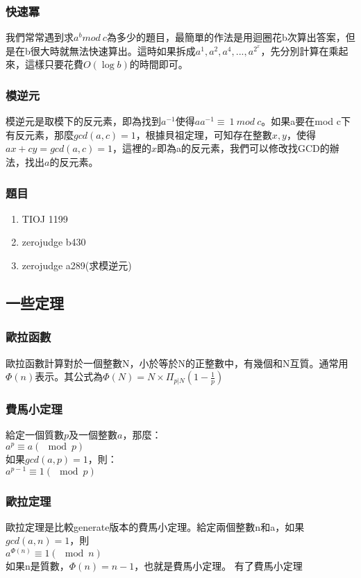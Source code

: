 \subsubsection{快速冪}
我們常常遇到求$a^b mod\ c$為多少的題目，最簡單的作法是用迴圈花b次算出答案，但是在b很大時就無法快速算出。這時如果拆成$a^1,a^2,a^4,...,a^{2^x}$，先分別計算在乘起來，這樣只要花費$O(\log b)$的時間即可。

\subsubsection{模逆元}
模逆元是取模下的反元素，即為找到$a^{-1}$使得$aa^{-1}\equiv\ 1\ mod\ c$。如果a要在mod c下有反元素，那麼$gcd(a,c)=1$，根據貝祖定理，可知存在整數$x,y$，使得$ax+cy=gcd(a,c)=1$，這裡的$x$即為a的反元素，我們可以修改找GCD的辦法，找出$a$的反元素。

\subsubsection{題目}
\begin{enumerate}
\item TIOJ 1199
\item zerojudge b430
\item zerojudge a289(求模逆元)
\end{enumerate}
\subsection{一些定理}
\subsubsection{歐拉函數}
歐拉函數計算對於一個整數N，小於等於N的正整數中，有幾個和N互質。通常用$\Phi(n)$表示。其公式為$\Phi(N)=N\times\Pi_{p|N}(1-\frac{1}{p})$

\subsubsection{費馬小定理}
給定一個質數$p$及一個整數$a$，那麼：\\
$a^p \equiv a (\mod p)$\\
如果$gcd(a,p)=1$，則：\\
$a^{p-1} \equiv 1 (\mod p)$\\
\subsubsection{歐拉定理}
歐拉定理是比較generate版本的費馬小定理。給定兩個整數n和a，如果$gcd(a,n)=1$，則\\
$a^{\Phi(n)} \equiv 1 (\mod n)$\\
如果n是質數，$\Phi(n)=n-1$，也就是費馬小定理。
有了費馬小定理
